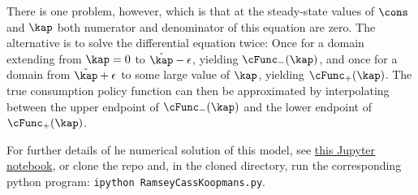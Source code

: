 \documentclass{handout}
\begin{document}
{  There is one problem, however, which is that at the steady-state values of $\cons$ and $\kap$ both numerator and denominator of this equation are zero.  The alternative is to solve the differential equation twice: Once for a domain extending from $\kap=0$ to $\check{\kap}-\epsilon$, yielding $\cFunc_{-}(\kap)$, and once for a domain from $\check{\kap}+\epsilon$ to some large value of $\kap$, yielding $\cFunc_{+}(\kap)$. The true consumption policy function can then be approximated by interpolating between the upper endpoint of $\cFunc_{-}(\kap)$ and the lower endpoint of $\cFunc_{+}(\kap)$.

  For further details of he numerical solution of this model, see \href{https://github.com/llorracc/Jupyter/notebooks/RamseyCassKoopmans.ipynb}{this Jupyter notebook}, or clone the repo and, in the cloned directory, run the corresponding python program: \texttt{ipython RamseyCassKoopmans.py}.


}{}
\end{document}

